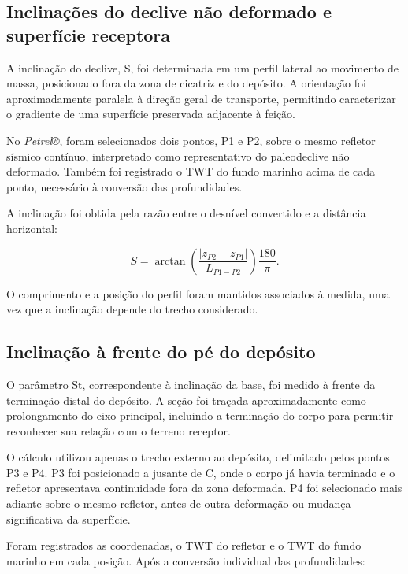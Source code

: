 \subsection{Inclinações do declive não deformado e superfície receptora}\label{sec:4-3-6}

A inclinação do declive, S, foi determinada em um perfil lateral ao movimento de massa, posicionado fora da zona de cicatriz e do depósito. A orientação foi aproximadamente paralela à direção geral de transporte, permitindo caracterizar o gradiente de uma superfície preservada adjacente à feição.

No \textit{Petrel®}, foram selecionados dois pontos, P1 e P2, sobre o mesmo refletor sísmico contínuo, interpretado como representativo do paleodeclive não deformado. Também foi registrado o TWT do fundo marinho acima de cada ponto, necessário à conversão das profundidades.

A inclinação foi obtida pela razão entre o desnível convertido e a distância horizontal:

\begin{equation}
  S=\arctan\!\left(\frac{\lvert z_{P2}-z_{P1}\rvert}{L_{P1-P2}}\right)\frac{180}{\pi}.
  \label{eq:inclinacao-declive}
\end{equation}

O comprimento e a posição do perfil foram mantidos associados à medida, uma vez que a inclinação depende do trecho considerado.

\subsection{Inclinação à frente do pé do depósito}\label{sec:4-3-7}

O parâmetro St, correspondente à inclinação da base, foi medido à frente da terminação distal do depósito. A seção foi traçada aproximadamente como prolongamento do eixo principal, incluindo a terminação do corpo para permitir reconhecer sua relação com o terreno receptor.

O cálculo utilizou apenas o trecho externo ao depósito, delimitado pelos pontos P3 e P4. P3 foi posicionado a jusante de C, onde o corpo já havia terminado e o refletor apresentava continuidade fora da zona deformada. P4 foi selecionado mais adiante sobre o mesmo refletor, antes de outra deformação ou mudança significativa da superfície.

Foram registrados as coordenadas, o TWT do refletor e o TWT do fundo marinho em cada posição. Após a conversão individual das profundidades:

